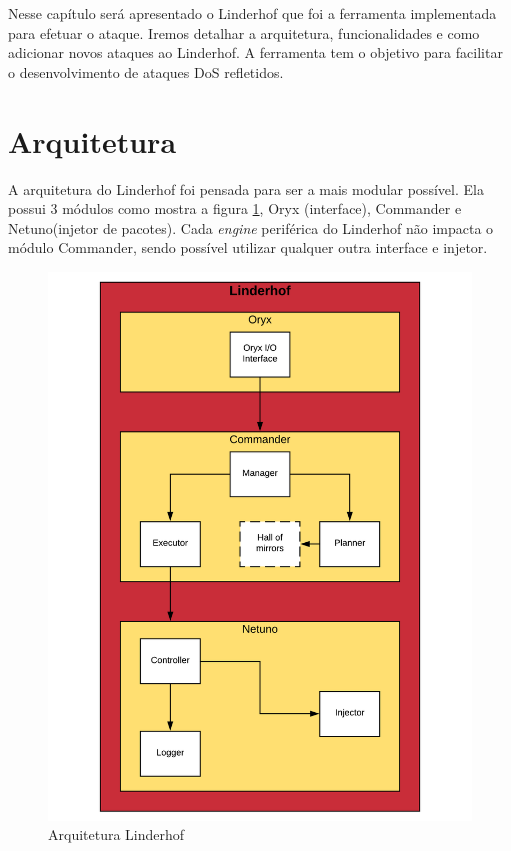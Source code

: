 Nesse capítulo será apresentado o Linderhof que foi a ferramenta implementada para efetuar o ataque. Iremos detalhar a arquitetura, funcionalidades e como adicionar novos ataques ao Linderhof. A ferramenta tem o objetivo para facilitar o desenvolvimento de ataques DoS refletidos.

\section{Arquitetura}

A arquitetura do Linderhof foi pensada para ser a mais modular possível. Ela possui 3 módulos como mostra a figura \ref{img:linderhof}, Oryx (interface), Commander e Netuno(injetor de pacotes). Cada \textit{engine} periférica do Linderhof não impacta o módulo Commander, sendo possível utilizar qualquer outra interface e injetor.

\begin{figure}[H]
     \centering
     \includegraphics[scale=0.6]{img/Linderhof.pdf}
     \caption{Arquitetura Linderhof }
     \label{img:linderhof}
\end{figure}

